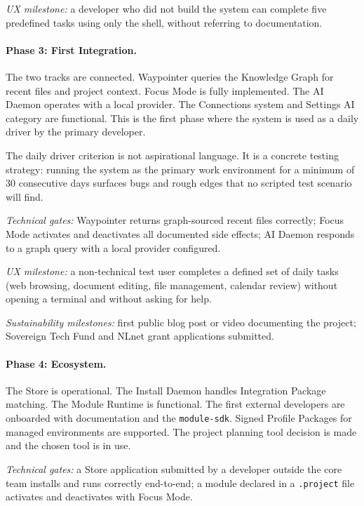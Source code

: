 \emph{UX milestone:} a developer who did not build the system can complete
five predefined tasks using only the shell, without referring to documentation.

\paragraph{Phase 3: First Integration.}
The two tracks are connected. Waypointer queries the Knowledge Graph for recent
files and project context. Focus Mode is fully implemented. The AI Daemon
operates with a local provider. The Connections system and Settings AI category
are functional. This is the first phase where the system is used as a daily
driver by the primary developer.

The daily driver criterion is not aspirational language. It is a concrete
testing strategy: running the system as the primary work environment for a
minimum of 30 consecutive days surfaces bugs and rough edges that no scripted
test scenario will find.

\emph{Technical gates:} Waypointer returns graph-sourced recent files
correctly; Focus Mode activates and deactivates all documented side effects;
AI Daemon responds to a graph query with a local provider configured.

\emph{UX milestone:} a non-technical test user completes a defined set of
daily tasks (web browsing, document editing, file management, calendar review)
without opening a terminal and without asking for help.

\emph{Sustainability milestones:} first public blog post or video documenting
the project; Sovereign Tech Fund and NLnet grant applications submitted.

\paragraph{Phase 4: Ecosystem.}
The Store is operational. The Install Daemon handles Integration Package
matching. The Module Runtime is functional. The first external developers are
onboarded with documentation and the \texttt{module-sdk}. Signed Profile
Packages for managed environments are supported. The project planning tool
decision is made and the chosen tool is in use.

\emph{Technical gates:} a Store application submitted by a developer outside
the core team installs and runs correctly end-to-end; a module declared in a
\texttt{.project} file activates and deactivates with Focus Mode.

